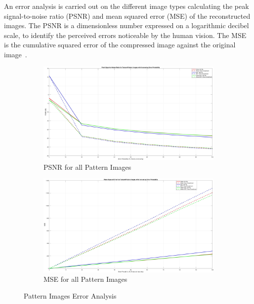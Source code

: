 \documentclass[landscape,a0paper,fontscale=0.4]{baposter} %
\begin{document}
\begin{poster}
{An error analysis is carried out on the different image types calculating the peak signal-to-noise ratio (PSNR) and mean squared error (MSE) of the reconstructed images. The PSNR is a dimensionless number expressed on a logarithmic decibel scale, to identify the perceived errors noticeable by the human vision. The MSE is the cumulative squared error of the compressed image against the original image~\cite{Error}.
\vspace{-1em}
\begin{figure}[H]
\centering
	\begin{subfigure}{0.4\textwidth} %
		\includegraphics[scale=0.06]{PSNRPattern}
		\caption{PSNR for all Pattern Images} %
	\end{subfigure}
	\vspace{1em} %
	\begin{subfigure}{0.4\textwidth} %
		\includegraphics[scale=0.06]{MSEPattern}
		\caption{MSE for all Pattern Images} %
	\end{subfigure}
	\vspace{-2em}
	\caption{Pattern Images Error Analysis}
	\label{fig: Pattern Error} %
\end{figure}


}
\end{poster}
\end{document}
